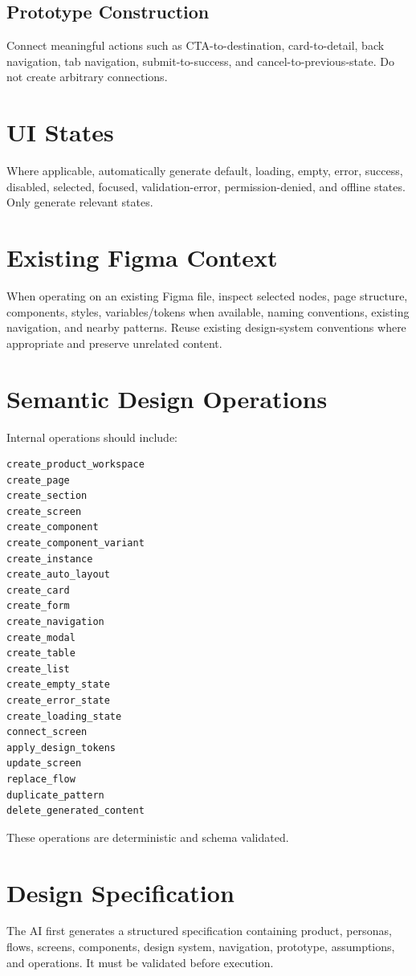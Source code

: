 \documentclass[11pt,a4paper]{article}
\begin{document}
\subsection{Prototype Construction}
Connect meaningful actions such as CTA-to-destination, card-to-detail, back navigation, tab navigation, submit-to-success, and cancel-to-previous-state. Do not create arbitrary connections.

\section{UI States}
Where applicable, automatically generate default, loading, empty, error, success, disabled, selected, focused, validation-error, permission-denied, and offline states. Only generate relevant states.

\section{Existing Figma Context}
When operating on an existing Figma file, inspect selected nodes, page structure, components, styles, variables/tokens when available, naming conventions, existing navigation, and nearby patterns. Reuse existing design-system conventions where appropriate and preserve unrelated content.

\section{Semantic Design Operations}
Internal operations should include:
\begin{lstlisting}
create_product_workspace
create_page
create_section
create_screen
create_component
create_component_variant
create_instance
create_auto_layout
create_card
create_form
create_navigation
create_modal
create_table
create_list
create_empty_state
create_error_state
create_loading_state
connect_screen
apply_design_tokens
update_screen
replace_flow
duplicate_pattern
delete_generated_content
\end{lstlisting}
These operations are deterministic and schema validated.

\section{Design Specification}
The AI first generates a structured specification containing product, personas, flows, screens, components, design system, navigation, prototype, assumptions, and operations. It must be validated before execution.
\end{document}
